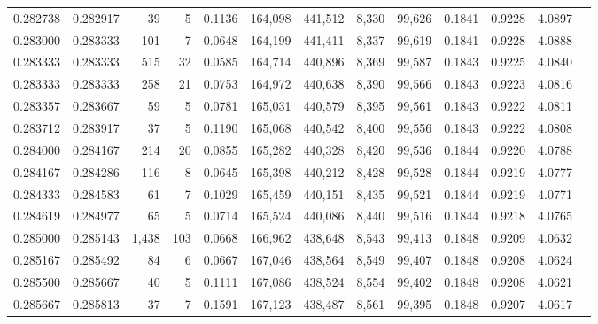 \begin{tabular}{rrrrrrrrrrrrr}
0.282738 & 0.282917 &    39 &   5 &                                     0.1136 & 164,098 & 441,512 &   8,330 &  99,626 & 0.1841 & 0.9228 & 4.0897 \\
0.283000 & 0.283333 &   101 &   7 &                                     0.0648 & 164,199 & 441,411 &   8,337 &  99,619 & 0.1841 & 0.9228 & 4.0888 \\
0.283333 & 0.283333 &   515 &  32 &                                     0.0585 & 164,714 & 440,896 &   8,369 &  99,587 & 0.1843 & 0.9225 & 4.0840 \\
0.283333 & 0.283333 &   258 &  21 &                                     0.0753 & 164,972 & 440,638 &   8,390 &  99,566 & 0.1843 & 0.9223 & 4.0816 \\
0.283357 & 0.283667 &    59 &   5 &                                     0.0781 & 165,031 & 440,579 &   8,395 &  99,561 & 0.1843 & 0.9222 & 4.0811 \\
0.283712 & 0.283917 &    37 &   5 &                                     0.1190 & 165,068 & 440,542 &   8,400 &  99,556 & 0.1843 & 0.9222 & 4.0808 \\
0.284000 & 0.284167 &   214 &  20 &                                     0.0855 & 165,282 & 440,328 &   8,420 &  99,536 & 0.1844 & 0.9220 & 4.0788 \\
0.284167 & 0.284286 &   116 &   8 &                                     0.0645 & 165,398 & 440,212 &   8,428 &  99,528 & 0.1844 & 0.9219 & 4.0777 \\
0.284333 & 0.284583 &    61 &   7 &                                     0.1029 & 165,459 & 440,151 &   8,435 &  99,521 & 0.1844 & 0.9219 & 4.0771 \\
0.284619 & 0.284977 &    65 &   5 &                                     0.0714 & 165,524 & 440,086 &   8,440 &  99,516 & 0.1844 & 0.9218 & 4.0765 \\
0.285000 & 0.285143 & 1,438 & 103 &                                     0.0668 & 166,962 & 438,648 &   8,543 &  99,413 & 0.1848 & 0.9209 & 4.0632 \\
0.285167 & 0.285492 &    84 &   6 &                                     0.0667 & 167,046 & 438,564 &   8,549 &  99,407 & 0.1848 & 0.9208 & 4.0624 \\
0.285500 & 0.285667 &    40 &   5 &                                     0.1111 & 167,086 & 438,524 &   8,554 &  99,402 & 0.1848 & 0.9208 & 4.0621 \\
0.285667 & 0.285813 &    37 &   7 &                                     0.1591 & 167,123 & 438,487 &   8,561 &  99,395 & 0.1848 & 0.9207 & 4.0617 \\

\end{tabular}
